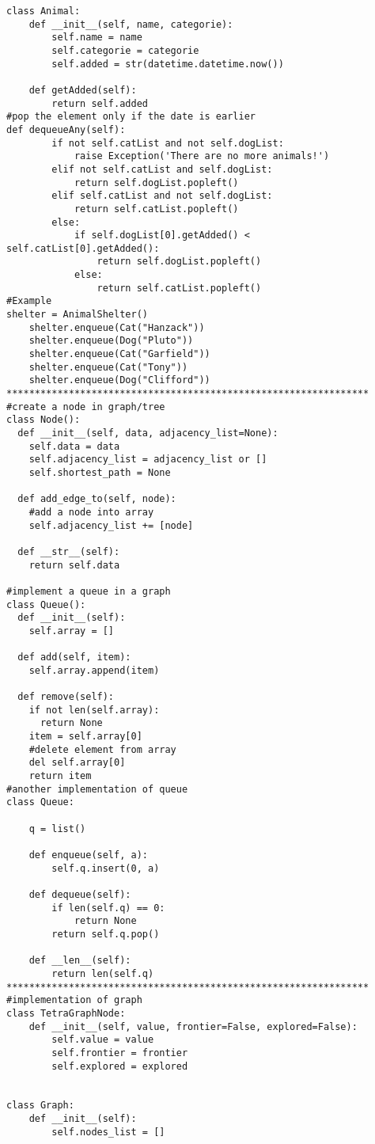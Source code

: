 \documentclass[12pt]{article}
\begin{document}
\begin{lstlisting}
class Animal:
	def __init__(self, name, categorie):
		self.name = name
		self.categorie = categorie
		self.added = str(datetime.datetime.now())

	def getAdded(self):
		return self.added
#pop the element only if the date is earlier
def dequeueAny(self):
		if not self.catList and not self.dogList:
			raise Exception('There are no more animals!')
		elif not self.catList and self.dogList:
			return self.dogList.popleft()
		elif self.catList and not self.dogList:
			return self.catList.popleft()
		else:
			if self.dogList[0].getAdded() < self.catList[0].getAdded():
				return self.dogList.popleft()
			else:
				return self.catList.popleft()
#Example
shelter = AnimalShelter()
    shelter.enqueue(Cat("Hanzack"))
    shelter.enqueue(Dog("Pluto"))
    shelter.enqueue(Cat("Garfield"))
    shelter.enqueue(Cat("Tony"))
    shelter.enqueue(Dog("Clifford"))
****************************************************************
#create a node in graph/tree
class Node():
  def __init__(self, data, adjacency_list=None):
    self.data = data
    self.adjacency_list = adjacency_list or []
    self.shortest_path = None
  
  def add_edge_to(self, node):
    #add a node into array
    self.adjacency_list += [node]

  def __str__(self):
    return self.data

#implement a queue in a graph
class Queue():
  def __init__(self):
    self.array = []
  
  def add(self, item):
    self.array.append(item)
  
  def remove(self):
    if not len(self.array):
      return None
    item = self.array[0]
    #delete element from array
    del self.array[0]
    return item
#another implementation of queue
class Queue:

    q = list()

    def enqueue(self, a):
        self.q.insert(0, a)

    def dequeue(self):
        if len(self.q) == 0:
            return None
        return self.q.pop()

    def __len__(self):
        return len(self.q)
****************************************************************
#implementation of graph
class TetraGraphNode:
    def __init__(self, value, frontier=False, explored=False):
        self.value = value
        self.frontier = frontier
        self.explored = explored


class Graph:
    def __init__(self):
        self.nodes_list = []


\end{lstlisting}
\end{document}
